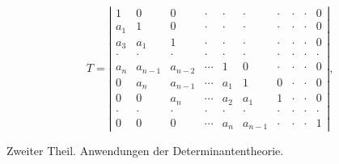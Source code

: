\[
T =
\left|
\begin{array}{cccccccccc}
1 & 0 & 0 & \cdot & \cdot & \cdot & \cdot & \cdot & \cdot & 0 \\
a_1 & 1 & 0 & \cdot & \cdot & \cdot & \cdot & \cdot & \cdot & 0 \\
a_3 & a_1 & 1 & \cdot & \cdot & \cdot & \cdot & \cdot & \cdot & 0 \\
\cdot & \cdot & \cdot & \cdot & \cdot & \cdot & \cdot & \cdot & \cdot & \cdot \\
a_n & a_{n-1} & a_{n-2} & \cdots & 1 & 0 & \cdot & \cdot & \cdot & 0 \\
0 & a_n & a_{n-1} & \cdots & a_1 & 1 & 0 & \cdot & \cdot & 0 \\
0 & 0 & a_n & \cdots & a_2 & a_1 & 1 & \cdot & \cdot & 0 \\
\cdot & \cdot & \cdot & \cdot & \cdot & \cdot & \cdot & \cdot & \cdot & \cdot \\
0 & 0 & 0 & \cdots & a_n & a_{n-1} & \cdot & \cdot & \cdot & 1
\end{array}
\right| ,
\]



Zweiter Theil. Anwendungen der Determinantentheorie.

